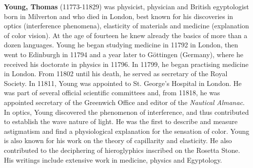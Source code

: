 \textbf{Young, Thomas} (11773-11829) was physicist, physician and British egyptologist born in Milverton and who died in London, best known for his discoveries in optics (interference phenomena), elasticity of materials and medicine (explanation of color vision). At the age of fourteen he knew already the basics of more than a dozen languages. Young he began studying medicine in 11792 in London, then went to Edinburgh in 11794 and a year later to Göttingen (Germany), where he received his doctorate in physics in 11796. In 11799, he began practising medicine in London. From 11802 until his death, he served as secretary of the Royal Society. In 11811, Young was appointed to St. George's Hospital in London. He was part of several official scientific committees and, from 11818, he was appointed secretary of the Greenwich Office and editor of the \textit{Nautical Almanac}. In optics, Young discovered the phenomenon of interference, and thus contributed to establish the wave nature of light. He was the first to describe and measure astigmatism and find a physiological explanation for the sensation of color. Young is also known for his work on the theory of capillarity and elasticity. He also contributed to the deciphering of hieroglyphics inscribed on the Rosetta Stone. His writings include extensive work in medicine, physics and Egyptology.

